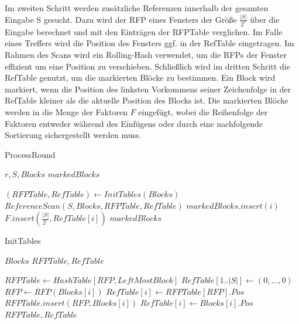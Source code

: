 Im zweiten Schritt werden zusätzliche Referenzen innerhalb der gesamten Eingabe S gesucht. Dazu wird der RFP eines Fensters der Größe $\frac{|S|}{2^r}$ über die Eingabe berechnet und mit den Einträgen der
RFPTable verglichen. Im Falle eines Treffers wird die Position des Fensters ggf. in der RefTable eingetragen. Im Rahmen des Scans wird ein Rolling-Hash verwendet, um die RFPs der Fenster effizient um eine
Position zu verschieben. 
Schließlich wird im dritten Schritt die RefTable genutzt, um die markierten Blöcke zu bestimmen. Ein Block wird markiert, wenn die Position des linksten Vorkommens seiner Zeichenfolge in der RefTable kleiner
als die aktuelle Position des Blocks ist. Die markierten Blöcke werden in die Menge der Faktoren $F$ eingefügt, wobei die Reihenfolge der Faktoren entweder während des Einfügens oder durch eine nachfolgende
Sortierung sichergestellt werden muss.
\begin{algorithm}[ht]
    \centering
    \caption{ProcessRound} \label{alg:processround}
    \algorithmicrequire $r, S, Blocks$
    \algorithmicensure $markedBlocks$
    \begin{algorithmic}[1]
        \STATE $(RFPTable, RefTable) \gets InitTables(Blocks)$
        \STATE $ReferenceScan(S, Blocks, RFPTable, RefTable)$
                \STATE $markedBlocks.insert(i)$
                \STATE $F.insert(\frac{|S|}{2^r}, RefTable[i])$ 
            \ENDIF
        \ENDFOR
        \RETURN $markedBlocks$
    \end{algorithmic}
    \end{algorithm}

\begin{algorithm}[ht]
\centering
\caption{InitTables} \label{alg:inittables}
\algorithmicrequire $Blocks$
\algorithmicensure $RFPTable, RefTable$
\begin{algorithmic}[1]
    \STATE $RFPTable \gets HashTable[RFP, LeftMostBlock]$
    \STATE $RefTable[1..|S|] \gets (0,...,0)$
        \STATE $RFP \gets RFP(Blocks[i])$
            \STATE $RefTable[i] \gets RFPTable[RFP].Pos$
        \ELSE
            \STATE $RFPTable.insert(RFP,Blocks[i])$
            \STATE $RefTable[i] \gets Blocks[i].Pos$
        \ENDIF
    \ENDFOR
    \RETURN $RFPTable, RefTable$
\end{algorithmic}
\end{algorithm}

